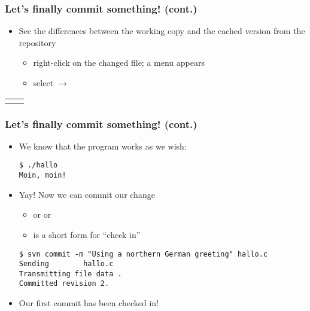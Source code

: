 \begin{frame}[fragile]
    \frametitle{Let's finally commit something! (cont.)}
    \begin{itemize}
        \item See the differences between the working copy and the cached
            version from the repository
            \begin{itemize}
                \item right-click on the changed file; a menu appears
                \item select  $\rightarrow$ 
            \end{itemize}
    \end{itemize}
    \begin{center}
        \begin{tabularx}{\textwidth}{cX}
            &
        \end{tabularx}
    \end{center}
\end{frame}

\begin{frame}[fragile]
    \linuxframe
    \frametitle{Let's finally commit something! (cont.)}
    \begin{itemize}
        \item We know that the program works as we wish:
\begin{lstlisting}
$ ./hallo 
Moin, moin!
\end{lstlisting}
        \item Yay!  Now we can commit our change
        \begin{itemize}
            \item {} or  or
            \item {} is a short form for \enquote{check in}
        \end{itemize}
\begin{lstlisting}
$ svn commit -m "Using a northern German greeting" hallo.c
Sending        hallo.c
Transmitting file data .
Committed revision 2.
\end{lstlisting}
        \item Our first commit has been checked in!
    \end{itemize}
\end{frame}

